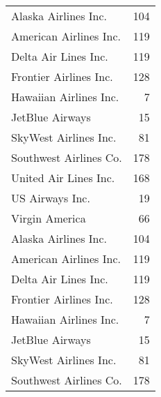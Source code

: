 \documentclass{article}
\begin{document}
\begin{longtable}[]{@{}lr@{}}
Alaska Airlines Inc. & 104 \\
American Airlines Inc. & 119 \\
Delta Air Lines Inc. & 119 \\
Frontier Airlines Inc. & 128 \\
Hawaiian Airlines Inc. & 7 \\
JetBlue Airways & 15 \\
SkyWest Airlines Inc. & 81 \\
Southwest Airlines Co. & 178 \\
United Air Lines Inc. & 168 \\
US Airways Inc. & 19 \\
Virgin America & 66 \\
Alaska Airlines Inc. & 104 \\
American Airlines Inc. & 119 \\
Delta Air Lines Inc. & 119 \\
Frontier Airlines Inc. & 128 \\
Hawaiian Airlines Inc. & 7 \\
JetBlue Airways & 15 \\
SkyWest Airlines Inc. & 81 \\
Southwest Airlines Co. & 178 \\
\bottomrule
\end{longtable}
\end{document}
